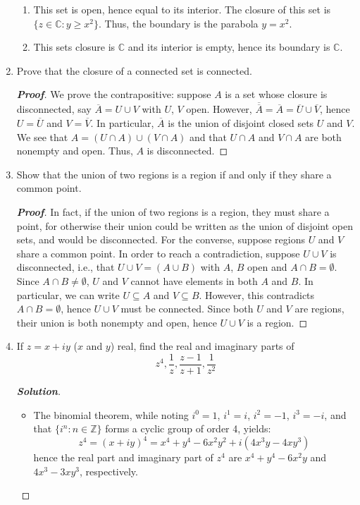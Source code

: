 \documentclass[12pt,leqno]{book}
\theoremstyle{definition}
\newcommand{\Z}{\mathbb{Z}}
\newcommand{\C}{\mathbb{C}}
\newenvironment{Proof}{\begin{proof}[\textnormal{\textbf{Proof}}]}{\end{proof}}
\newenvironment{Solution}{\begin{proof}[\textnormal{\textbf{Solution}}]}{\end{proof}}
\begin{document}
\begin{enumerate}
\begin{enumerate}
   \item This set is open, hence equal to its interior. The closure of this set is $\{z\in\C:y\geq x^2\}$. Thus, the boundary is the parabola $y=x^2$. 
   \item This sets closure is $\C$ and its interior is empty, hence its boundary is $\C$. 
  \end{enumerate}
 \item Prove that the closure of a connected set is connected.
  \begin{Proof}
   We prove the contrapositive: suppose $A$ is a set whose closure is disconnected, say $\overline{A}=U\cup V$ with $U$, $V$ open.  However, $\overline{\overline{A}}=\overline{A}=\overline{U}\cup\overline{V}$, hence $U=\overline{U}$ and $V=\overline{V}$. In particular, $\overline{A}$ is the union of disjoint closed sets $U$ and $V$. We see that $A=(U\cap A)\cup(V\cap A)$ and that $U\cap A$ and $V\cap A$ are both nonempty and open. Thus, $A$ is disconnected.
  \end{Proof}
 \item Show that the union of two regions is a region if and only if they share a common point.
  \begin{Proof}
   In fact, if the union of two regions is a region, they must share a point, for otherwise their union could be written as the union of disjoint open sets, and would be disconnected. For the converse, suppose regions $U$ and $V$ share a common point. In order to reach a contradiction, suppose $U\cup V$ is disconnected, i.e., that $U\cup V=(A\cup B)$ with $A$, $B$ open and $A\cap B=\emptyset$. Since $A\cap B\not=\emptyset$, $U$ and $V$ cannot have elements in both $A$ and $B$. In particular, we can write $U\subseteq A$ and $V\subseteq B$. However, this contradicts $A\cap B=\emptyset$, hence $U\cup V$ must be connected. Since both $U$ and $V$ are regions, their union is both nonempty and open, hence $U\cup V$ is a region.
  \end{Proof}
 \item If $z=x+iy$ ($x$ and $y$) real, find the real and imaginary parts of \[z^4, \frac{1}{z}, \frac{z-1}{z+1}, \frac{1}{z^2}\]
  \begin{Solution}\indent
   \begin{itemize}
    \item The binomial theorem, while noting $i^0=1$, $i^1=i$, $i^2=-1$, $i^3=-i$, and that $\{i^n:n\in\Z\}$ forms a cyclic group of order 4, yields: \[z^4=(x+iy)^4=x^4+y^4-6x^2y^2+i(4x^3y-4xy^3)\] hence the real part and imaginary part of $z^4$ are $x^4+y^4-6x^2y$ and $4x^3-3xy^3$, respectively.

\end{itemize}
\end{Solution}
\end{enumerate}
\end{document}

